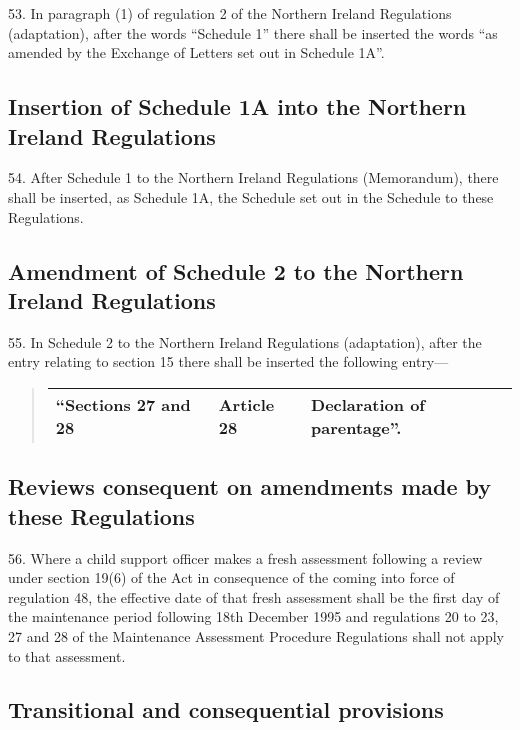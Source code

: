 \documentclass[a4paper]{article}
\begin{document}
53.  In paragraph (1) of regulation 2 of the Northern Ireland Regulations (adaptation), after the words “Schedule 1” there shall be inserted the words “as amended by the Exchange of Letters set out in Schedule 1A”.

\subsection[54. Insertion of Schedule 1A into the Northern Ireland Regulations]{Insertion of Schedule 1A into the Northern Ireland Regulations}

54.  After Schedule 1 to the Northern Ireland Regulations (Memorandum), there shall be inserted, as Schedule 1A, the Schedule set out in the Schedule to these Regulations.

\subsection[55. Amendment of Schedule 2 to the Northern Ireland Regulations]{Amendment of Schedule 2 to the Northern Ireland Regulations}

55.  In Schedule 2 to the Northern Ireland Regulations (adaptation), after the entry relating to section 15 there shall be inserted the following entry—
\begin{quotation}
\noindent
\begin{tabular}{lll}
\hline
“Sections 27 and 28 & Article 28 & Declaration of parentage”.\\
\hline
\end{tabular}
\end{quotation}

\subsection[56. Reviews consequent on amendments made by these Regulations]{\sloppy Reviews consequent on amendments made by these Regulations}

56.  Where a child support officer makes a fresh assessment following a review under section 19(6) of the Act in consequence of the coming into force of regulation 48, the effective date of that fresh assessment shall be the first day of the maintenance period following 18th December 1995 and regulations 20 to 23, 27 and 28 of the Maintenance Assessment Procedure Regulations shall not apply to that assessment.

\subsection[57. Transitional and consequential provisions]{Transitional and consequential provisions}
\end{document}
